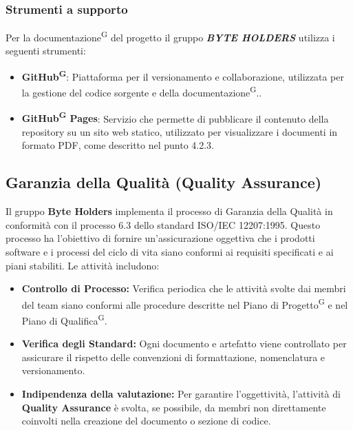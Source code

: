 \documentclass[a4paper, 11pt]{article}
\begin{document}
\subsubsection{Strumenti a supporto}

Per la documentazione\textsuperscript{G} del progetto il gruppo \textbf{\textit{BYTE HOLDERS}} utilizza i seguenti strumenti:

\begin{itemize}
    \item \textbf{GitHub\textsuperscript{G}}: Piattaforma per il versionamento e collaborazione, utilizzata per la gestione del codice sorgente e della documentazione\textsuperscript{G}..
    \item \textbf{GitHub\textsuperscript{G} Pages}: Servizio che permette di pubblicare il contenuto della repository su un sito web statico, utilizzato per visualizzare i documenti in formato PDF, come descritto nel punto 4.2.3.
\end{itemize}



\subsection{Garanzia della Qualità (Quality Assurance)}

Il gruppo \textbf{Byte Holders} implementa il processo di Garanzia della Qualità in conformità con il processo 6.3 dello standard ISO/IEC 12207:1995. Questo processo ha l'obiettivo di fornire un'assicurazione oggettiva che i prodotti software e i processi del ciclo di vita siano conformi ai requisiti specificati e ai piani stabiliti. Le attività includono:

\begin{itemize}
    \item \textbf{Controllo di Processo:} Verifica periodica che le attività svolte dai membri del team siano conformi alle procedure descritte nel Piano di Progetto\textsuperscript{G} e nel Piano di Qualifica\textsuperscript{G}.
    \item \textbf{Verifica degli Standard:} Ogni documento e artefatto viene controllato per assicurare il rispetto delle convenzioni di formattazione, nomenclatura e versionamento.
    \item \textbf{Indipendenza della valutazione:} Per garantire l'oggettività, l'attività di \textbf{Quality Assurance} è svolta, se possibile, da membri non direttamente coinvolti nella creazione del documento o sezione di codice.
\end{itemize}
\end{document}

